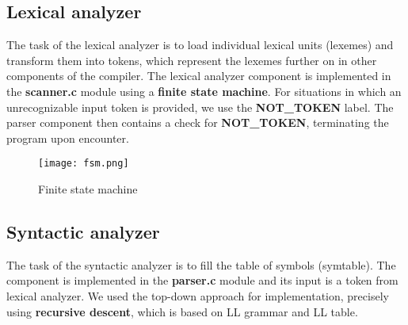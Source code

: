 \documentclass{article}
\begin{document}
\subsection{Lexical analyzer}
The task of the lexical analyzer is to load individual lexical units (lexemes) and transform them into tokens, which represent the lexemes further on in other components of the compiler. The lexical analyzer component is implemented in the \textbf{scanner.c} module using a \textbf{finite state machine}. For situations in which an unrecognizable input token is provided, we use the \textbf{NOT\_TOKEN} label. The parser component then contains a check for \textbf{NOT\_TOKEN}, terminating the program upon encounter.
\newline
\begin{figure}
\begin{center}
\texttt{[image: fsm.png]}
\caption{Finite state machine}
\label{fig:1}
\end{center}
\end{figure}
\newpage
\subsection{Syntactic analyzer}
The task of the syntactic analyzer is to fill the table of symbols (symtable). The component is implemented in the \textbf{parser.c} module and its input is a token from lexical analyzer. We used the top-down approach for implementation, precisely using \textbf{recursive descent}, which is based on LL grammar and LL table. 
\end{document}
